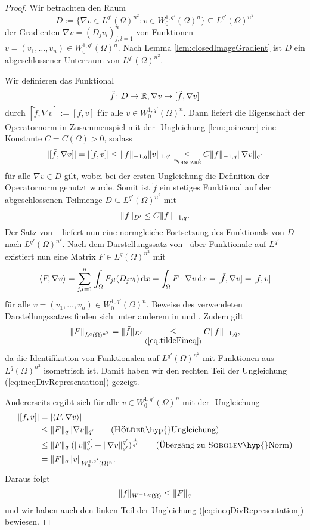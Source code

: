 \begin{proof}
  Wir betrachten den Raum
  $$
  D := \{\nabla v \in L^{q'}(\Omega)^{n^2} \colon v \in W_0^{1,q'}(\Omega)^n\} \subseteq L^{q'}(\Omega)^{n^2}
  $$
  der Gradienten $\nabla v = (D_j v_l)_{j,l=1}^n$ von Funktionen $v = (v_1,\dots,v_n) \in W_0^{1,q'}(\Omega)^n$.
  Nach Lemma \ref{lem:closedImageGradient} ist $D$ ein abgeschlossener Unterraum von $L^{q'}(\Omega)^{n^2}$.

  Wir definieren das Funktional
  $$
  \tilde f \colon D \to \R, \nabla v \mapsto [\tilde f, \nabla v]
  $$
  durch $[\tilde f, \nabla v] := [f, v]$ für alle $v \in W_0^{1,q'}(\Omega)^n$.
  Dann liefert die Eigenschaft der Operatornorm in Zusammenspiel mit der \poincare\hyp{}Ungleichung \ref{lem:poincare} eine Konstante $C = C(\Omega) > 0$, sodass 
  $$
  |[\tilde f, \nabla v]| 
  = |[f, v]| 
  \leq \norm{f}_{-1,q} \norm{v}_{1,q'}
  \underset{\poincare}{\leq} C \norm{f}_{-1,q} \norm{\nabla v }_{q'}
  $$
  für alle $\nabla v \in D$ gilt, wobei bei der ersten Ungleichung die Definition der Operatornorm genutzt wurde.
  Somit ist $\tilde f$ ein stetiges Funktional auf der abgeschlossenen Teilmenge $D \subseteq L^{q'}(\Omega)^{n^2}$ mit 
  \begin{equation}
    \label{eq:tildeFineq}
    \norm{\tilde f}_{D'} \leq C\norm{f}_{-1,q}.
  \end{equation}
  Der Satz von \hahn\hyp{}\banach\ liefert nun eine normgleiche Fortsetzung des Funktionals von $D$ nach $L^{q'}(\Omega)^{n^2}$.
  Nach dem Darstellungssatz von \riesz\ über Funktionale auf $L^{q'}$  existiert nun eine Matrix $F \in L^{q}(\Omega)^{n^2}$ mit
  $$
  \langle F, \nabla v \rangle
  = \sum_{j,l=1}^n \int_\Omega F_{jl}(D_j v_l) \d x
  = \int_\Omega F \cdot \nabla v \d x
  = [\tilde f, \nabla v] 
  = [f, v]
  $$
  für alle $v = (v_1,\dots,v_n) \in W_0^{1,q'}(\Omega)^n$.
  Beweise des verwendeten Darstellungssatzes finden sich unter anderem in \cite[S.47, Theorem 2.44]{adams2003sobolev} und \cite[S.60, Satz II.2.4]{werner2011fa}.
  Zudem gilt
  $$ 
  \norm{F}_{L^q(\Omega)^{n^2}} 
  = \norm{\tilde f}_{D'} 
  \underset{(\ref{eq:tildeFineq})}{\leq} C \norm{f}_{-1,q},$$
  da die Identifikation von Funktionalen auf $L^{q'}(\Omega)^{n^2}$ mit Funktionen aus $L^q(\Omega)^{n^2}$ isometrisch ist.
  Damit haben wir den rechten Teil der Ungleichung (\ref{eq:ineqDivRepresentation}) gezeigt.

  Andererseits ergibt sich für alle $v \in W_0^{1,q'}(\Omega)^n$ mit der \hoelder\hyp{}Ungleichung
  \begin{align*}
    |[f,v]| 
    &= |\langle F, \nabla v\rangle|  \\
    &\leq \norm{F}_q \norm{\nabla v}_{q'}  \tag{\hoelder\hyp{}Ungleichung}\\
    &\leq \norm{F}_q \;(\norm{v}_{q'}^{q'} + \norm{\nabla v}_{q'}^{q'})^{\frac{1}{q'}} \tag{Übergang zu \sobolev\hyp{}Norm}\\
    &= \norm{F}_q \norm{v}_{W_0^{1,q'}(\Omega)^n}.
  \end{align*}
  Daraus folgt
  $$
  \norm{f}_{W^{-1,q}(\Omega)} \leq \norm{F}_q
  $$
  und wir haben auch den linken Teil der Ungleichung (\ref{eq:ineqDivRepresentation}) bewiesen.


\end{proof}
